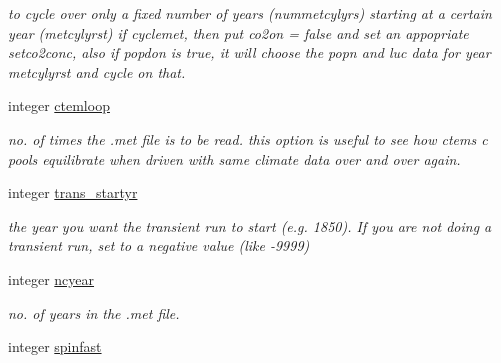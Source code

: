 \begin{DoxyCompactItemize}
\begin{DoxyCompactList}\small\item\em to cycle over only a fixed number of years (nummetcylyrs) starting at a certain year (metcylyrst) if cyclemet, then put co2on = false and set an appopriate setco2conc, also if popdon is true, it will choose the popn and luc data for year metcylyrst and cycle on that. \end{DoxyCompactList}\item 
\hypertarget{structctem__statevars_1_1ctem__switches_a5753e2c98456d8d90035afc8a2a9cf54}{}integer \hyperlink{structctem__statevars_1_1ctem__switches_a5753e2c98456d8d90035afc8a2a9cf54}{ctemloop}\label{structctem__statevars_1_1ctem__switches_a5753e2c98456d8d90035afc8a2a9cf54}

\begin{DoxyCompactList}\small\item\em no. of times the .met file is to be read. this option is useful to see how ctem\textquotesingle{}s c pools equilibrate when driven with same climate data over and over again. \end{DoxyCompactList}\item 
\hypertarget{structctem__statevars_1_1ctem__switches_a876092522d266637893516b240f60e9f}{}integer \hyperlink{structctem__statevars_1_1ctem__switches_a876092522d266637893516b240f60e9f}{trans\+\_\+startyr}\label{structctem__statevars_1_1ctem__switches_a876092522d266637893516b240f60e9f}

\begin{DoxyCompactList}\small\item\em the year you want the transient run to start (e.\+g. 1850). If you are not doing a transient run, set to a negative value (like -\/9999) \end{DoxyCompactList}\item 
\hypertarget{structctem__statevars_1_1ctem__switches_a606165b425cb3672e6b2761d2545dca5}{}integer \hyperlink{structctem__statevars_1_1ctem__switches_a606165b425cb3672e6b2761d2545dca5}{ncyear}\label{structctem__statevars_1_1ctem__switches_a606165b425cb3672e6b2761d2545dca5}

\begin{DoxyCompactList}\small\item\em no. of years in the .met file. \end{DoxyCompactList}\item 
\hypertarget{structctem__statevars_1_1ctem__switches_a55460bfaad642095697779680a5acfa5}{}integer \hyperlink{structctem__statevars_1_1ctem__switches_a55460bfaad642095697779680a5acfa5}{spinfast}\label{structctem__statevars_1_1ctem__switches_a55460bfaad642095697779680a5acfa5}


\end{DoxyCompactItemize}
